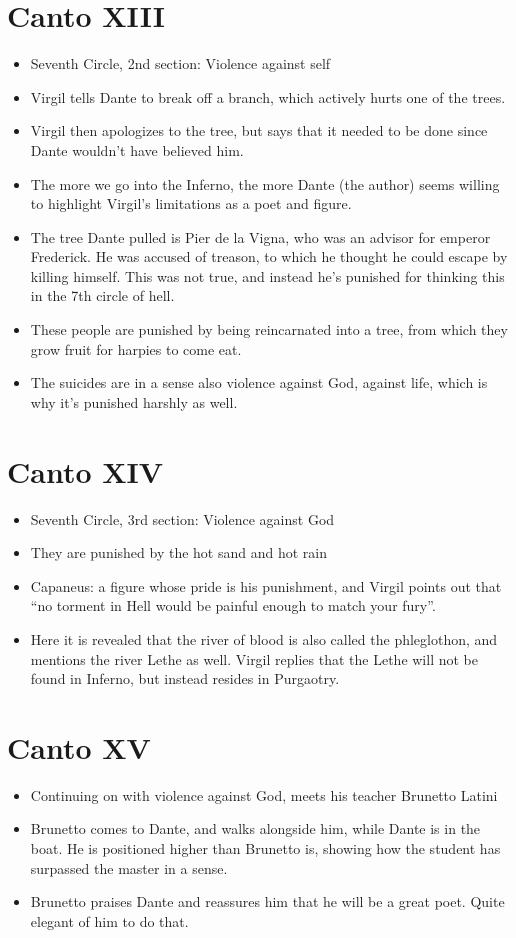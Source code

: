 \documentclass[10pt]{article}
\begin{document}
	\section{Canto XIII}
	\begin{itemize}
		\item Seventh Circle, 2nd section: Violence against self
		\item Virgil tells Dante to break off a branch, which actively hurts one of the trees. 
		\item Virgil then apologizes to the tree, but says that it needed to be done since Dante wouldn't have 
			believed him. 
		\item The more we go into the Inferno, the more Dante (the author) seems willing to highlight 
			Virgil's limitations as a poet and figure.
		\item The tree Dante pulled is Pier de la Vigna, who was an advisor for emperor Frederick. He was 
			accused of treason, to which he thought he could escape by killing himself. This was not true, and 
			instead he's punished for thinking this in the 7th circle of hell.
		\item These people are punished by being reincarnated into a tree, from which they grow fruit 
			for harpies to come eat. 
		\item The suicides are in a sense also violence against God, against life, which is why it's punished 
			harshly as well. 
	\end{itemize}
	\section{Canto XIV}
	\begin{itemize}
		\item Seventh Circle, 3rd section: Violence against God
		\item They are punished by the hot sand and hot rain
		\item Capaneus: a figure whose pride is his punishment, and Virgil points out that ``no torment 
			in Hell would be painful enough to match your fury''.
		\item Here it is revealed that the river of blood is also called the phleglothon, and mentions the 
			river Lethe as well. Virgil replies that the Lethe will not be found in Inferno, but 
			instead resides in Purgaotry.  
	\end{itemize}
	\section{Canto XV}
	\begin{itemize}
		\item Continuing on with violence against God, meets his teacher Brunetto Latini
		\item Brunetto comes to Dante, and walks alongside him, while Dante is in the boat. He is positioned 
			higher than Brunetto is, showing how the student has surpassed the master in a sense. 
		\item Brunetto praises Dante and reassures him that he will be a great poet. Quite elegant 
			of him to do that.
	\end{itemize}
\end{document}
